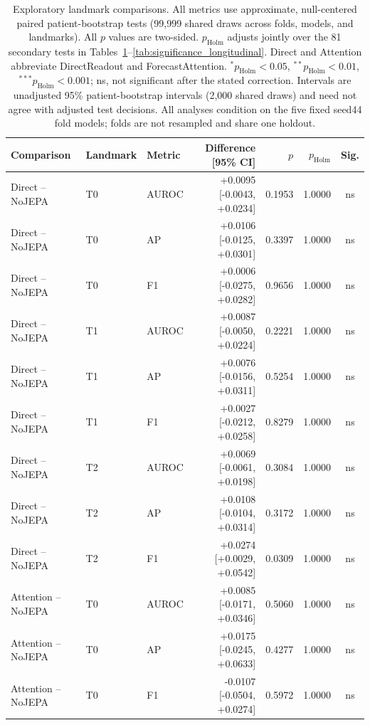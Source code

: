 \begin{table}[t]
\centering
\small
\caption{Exploratory landmark comparisons. All metrics use approximate, null-centered paired patient-bootstrap tests (99,999 shared draws across folds, models, and landmarks). All $p$ values are two-sided. $p_{\mathrm{Holm}}$ adjusts jointly over the 81 secondary tests in Tables~\ref{tab:significance_landmarks}--\ref{tab:significance_longitudinal}. Direct and Attention abbreviate DirectReadout and ForecastAttention. $^{*}p_{\mathrm{Holm}}<0.05$, $^{**}p_{\mathrm{Holm}}<0.01$, $^{***}p_{\mathrm{Holm}}<0.001$; ns, not significant after the stated correction. Intervals are unadjusted 95\% patient-bootstrap intervals (2,000 shared draws) and need not agree with adjusted test decisions. All analyses condition on the five fixed seed44 fold models; folds are not resampled and share one holdout.}
\label{tab:significance_landmarks}
\begin{tabular}{lllrrrc}
\toprule
Comparison & Landmark & Metric & Difference [95\% CI] & $p$ & $p_{\mathrm{Holm}}$ & Sig. \\
\midrule
Direct -- NoJEPA & T0 & AUROC & +0.0095 [-0.0043, +0.0234] & 0.1953 & 1.0000 & ns \\
Direct -- NoJEPA & T0 & AP & +0.0106 [-0.0125, +0.0301] & 0.3397 & 1.0000 & ns \\
Direct -- NoJEPA & T0 & F1 & +0.0006 [-0.0275, +0.0282] & 0.9656 & 1.0000 & ns \\
Direct -- NoJEPA & T1 & AUROC & +0.0087 [-0.0050, +0.0224] & 0.2221 & 1.0000 & ns \\
Direct -- NoJEPA & T1 & AP & +0.0076 [-0.0156, +0.0311] & 0.5254 & 1.0000 & ns \\
Direct -- NoJEPA & T1 & F1 & +0.0027 [-0.0212, +0.0258] & 0.8279 & 1.0000 & ns \\
Direct -- NoJEPA & T2 & AUROC & +0.0069 [-0.0061, +0.0198] & 0.3084 & 1.0000 & ns \\
Direct -- NoJEPA & T2 & AP & +0.0108 [-0.0104, +0.0314] & 0.3172 & 1.0000 & ns \\
Direct -- NoJEPA & T2 & F1 & +0.0274 [+0.0029, +0.0542] & 0.0309 & 1.0000 & ns \\
Attention -- NoJEPA & T0 & AUROC & +0.0085 [-0.0171, +0.0346] & 0.5060 & 1.0000 & ns \\
Attention -- NoJEPA & T0 & AP & +0.0175 [-0.0245, +0.0633] & 0.4277 & 1.0000 & ns \\
Attention -- NoJEPA & T0 & F1 & -0.0107 [-0.0504, +0.0274] & 0.5972 & 1.0000 & ns \\

\end{tabular}
\end{table}
